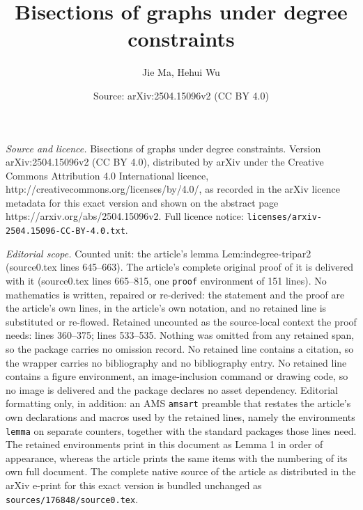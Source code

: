 \documentclass[10pt,a4paper]{amsart}
\title{Bisections of graphs under degree constraints}
\author{Jie Ma, Hehui Wu}
\date{Source: arXiv:2504.15096v2 (CC BY 4.0)}
\begin{document}
\maketitle

\noindent\emph{Source and licence.} Bisections of graphs under degree constraints. Version arXiv:2504.15096v2 (CC BY 4.0), distributed by arXiv under the Creative Commons Attribution 4.0 International licence, http://creativecommons.org/licenses/by/4.0/, as recorded in the arXiv licence metadata for this exact version and shown on the abstract page https://arxiv.org/abs/2504.15096v2. Full licence notice: \texttt{licenses/arxiv-2504.15096-CC-BY-4.0.txt}.\par\smallskip

\noindent\textit{Editorial scope.} Counted unit: the article's lemma Lem:indegree-tripar2 (source0.tex lines 645--663). The article's complete original proof of it is delivered with it (source0.tex lines 665--815, one \texttt{proof} environment of 151 lines). No mathematics is written, repaired or re-derived: the statement and the proof are the article's own lines, in the article's own notation, and no retained line is substituted or re-flowed.  Retained uncounted as the source-local context the proof needs: lines 360--375; lines 533--535.  Nothing was omitted from any retained span, so the package carries no omission record.  No retained line contains a citation, so the wrapper carries no bibliography and no bibliography entry.  No retained line contains a figure environment, an image-inclusion command or drawing code, so no image is delivered and the package declares no asset dependency.  Editorial formatting only, in addition: an AMS \texttt{amsart} preamble that restates the article's own declarations and macros used by the retained lines, namely the environments \texttt{lemma} on separate counters, together with the standard packages those lines need.  The retained environments print in this document as Lemma 1 in order of appearance, whereas the article prints the same items with the numbering of its own full document.  The complete native source of the article as distributed in the arXiv e-print for this exact version is bundled unchanged as \texttt{sources/176848/source0.tex}.
\end{document}

